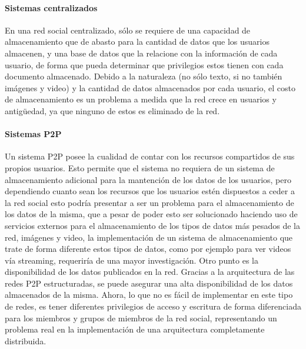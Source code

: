     \paragraph{Sistemas centralizados}
    En una red social centralizado, sólo se requiere de una capacidad de
    almacenamiento que de abasto para la cantidad de datos que los usuarios
    almacenen, y una base de datos que la relacione con la información de cada
    usuario, de forma que pueda determinar que privilegios estos tienen con cada
    documento almacenado. Debido a la naturaleza (no sólo texto, si no también
    imágenes y video) y la cantidad de datos almacenados por cada
    usuario, el costo de almacenamiento es un problema a medida que la red crece en
    usuarios y antigüedad, ya que ninguno de estos es eliminado de la red.
    
    \paragraph{Sistemas P2P}
    Un sistema P2P posee la cualidad de contar con los recursos compartidos de sus
    propios usuarios. Esto permite que el sistema no requiera de un sistema de
    almacenamiento adicional para la mantención de los datos de los usuarios, pero
    dependiendo cuanto sean los recursos que los usuarios estén dispuestos a ceder
    a la red social esto podría presentar a ser un problema para el almacenamiento
    de los datos de la misma, que a pesar de poder esto ser solucionado haciendo uso de servicios externos para el
    almacenamiento de los tipos de datos más pesados de la red, imágenes y video,
    la implementación de un sistema de almacenamiento que trate de forma diferente
    estos tipos de datos, como por ejemplo para ver videos vía streaming,
    requeriría de una mayor investigación.
    Otro punto es la disponibilidad de los datos publicados en la red. Gracias a la
    arquitectura de las redes P2P estructuradas, se puede asegurar una alta
    disponibilidad de los datos almacenados de la misma. Ahora, lo que no es fácil
    de implementar en este tipo de redes, es tener diferentes privilegios de
    acceso y escritura de forma diferenciada para los miembros y grupos de miembros
    de la red social, representando un problema real en la implementación de una
    arquitectura completamente distribuida. 
    
